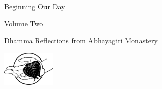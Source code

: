 \documentclass[11pt,openany]{memoir}
\begin{document}
\frontmatter
{}
\pagestyle{empty}

\newcommand{\glosskip}{.6em}
\newcommand\glossentry[2]{\textbf{#1}\hspace{\glosskip}#2\par}
\newcommand\glossentrylang[3]{\textbf{#1} (#2)\hspace{\glosskip}#3\par}

\begin{center}
\vspace*{100pt}
{ \huge Beginning Our Day }

\vspace{20pt}
{ \Large Volume Two}

\vspace{40pt}

{\large
Dhamma Reflections from Abhayagiri Monastery
}

\vfill{}

\includegraphics[width=1in]{abm_logo.eps}

\end{center}
\clearpage





\clearpage
\mbox{}\clearpage

\pagestyle{plain}
\tableofcontents*


\clearpage

\thispagestyle{empty}
\mbox{} \clearpage





\mainmatter





\clearpage


\end{document}
